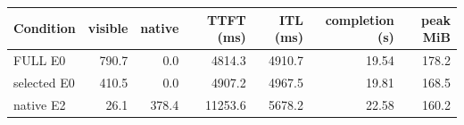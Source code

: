 \begin{tabular}{lrrrrrr}
\toprule
Condition & visible & native & TTFT (ms) & ITL (ms) & completion (s) & peak MiB \\
\midrule
FULL E0 & 790.7 & 0.0 & 4814.3 & 4910.7 & 19.54 & 178.2 \\
selected E0 & 410.5 & 0.0 & 4907.2 & 4967.5 & 19.81 & 168.5 \\
native E2 & 26.1 & 378.4 & 11253.6 & 5678.2 & 22.58 & 160.2 \\
\bottomrule
\end{tabular}
